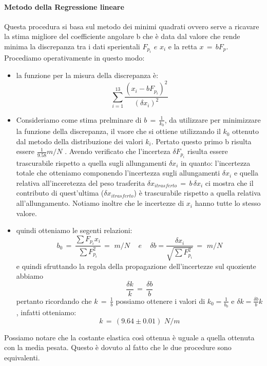 \paragraph{Metodo della Regressione lineare\\}
Questa procedura si basa sul metodo dei minimi quadrati ovvero serve a ricavare la stima migliore del coefficiente angolare b che è data dal valore che rende minima la discrepanza tra i dati sperientali $F_{p_i} \,\,e\,\, x_i$ e la retta $x \,=\, bF_p$.\\
Procediamo operativamente in questo modo:
\begin{itemize}
	\item{la funzione per la misura della discrepanza è:
			\begin{equation*}
				\sum_{i=1}^{13} \frac{(x_i - bF_{p_i})^2}{(\delta x_i)^2}	
			\end{equation*}}
	\item{Consideriamo come stima prelminare di $b \,=\, \frac{1}{k_0}$, da utilizzare per minimizzare la funzione della discrepanza, il vaore che si ottiene utilizzando il $k_0$ ottenuto dal metodo della distribuzione dei valori $k_i$. Pertato questo primo b risulta essere $\frac{1}{9.58} m/N$ . Avendo verificato che l'incerteza $\delta F_{p_i}$ risulta essere trascurabile rispetto a quella sugli allungamenti $\delta x_i$ in quanto: l'incertezza totale che otteniamo componendo l'incertezza sugli allungamenti $\delta x_i$ e quella relativa all'inceretezza del peso trasferita $\delta x_{i trasferto} \,=\, b \, \delta x_i $ ci mostra che il contributo di quest'ultima ($\delta x_{i trasferto}$) è trascurabile rispetto a quella relativa all'allungamento. Notiamo inoltre che le incertezze di $x_i$ hanno tutte lo stesso valore.}
	\item{quindi otteniamo le segenti relazioni:
			\begin{equation*}
				b_0  \,=\,  \frac{\sum F_{p_i}  x_i}{\sum F_{p_i}^2} \,=\,  \, m/N \,\,\,\,\,\,\, e \,\,\,\,\,\,\,
				\delta b  =  \frac{\delta x_i}{\sqrt{\sum F_{p_i}^2}} \,=\,  \, m/N
			\end{equation*}
			e quindi sfruttando la regola della propagazione dell'incertezze sul quoziente abbiamo
			\begin{equation*}
				\frac{\delta k}{k} \,=\, \frac{\delta b}{b}
			\end{equation*}
			pertanto ricordando che $k \,=\, \frac{1}{b}$ possiamo ottenere i valori di $k_0 = \frac{1}{b_0}$ e $\delta k = \frac{\delta b}{b} k$, infatti otteniamo:
			\begin{equation*}
				k \,=\, (9.64 \pm 0.01) \,\,N/m
			\end{equation*}
			}
\end{itemize}
Possiamo notare che la costante elastica così ottenua è uguale a quella ottenuta con la media pesata. Questo è dovuto al fatto che le due procedure sono equivalenti.

